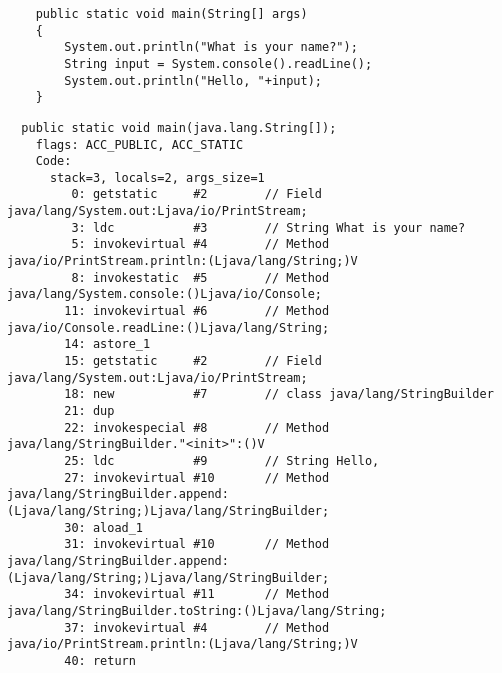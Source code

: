 \subsubsection{}


\begin{lstlisting}
	public static void main(String[] args)
	{
		System.out.println("What is your name?");
		String input = System.console().readLine();
		System.out.println("Hello, "+input);
	}
\end{lstlisting}

\begin{lstlisting}
  public static void main(java.lang.String[]);
    flags: ACC_PUBLIC, ACC_STATIC
    Code:
      stack=3, locals=2, args_size=1
         0: getstatic     #2        // Field java/lang/System.out:Ljava/io/PrintStream;
         3: ldc           #3        // String What is your name?
         5: invokevirtual #4        // Method java/io/PrintStream.println:(Ljava/lang/String;)V
         8: invokestatic  #5        // Method java/lang/System.console:()Ljava/io/Console;
        11: invokevirtual #6        // Method java/io/Console.readLine:()Ljava/lang/String;
        14: astore_1      
        15: getstatic     #2        // Field java/lang/System.out:Ljava/io/PrintStream;
        18: new           #7        // class java/lang/StringBuilder
        21: dup           
        22: invokespecial #8        // Method java/lang/StringBuilder."<init>":()V
        25: ldc           #9        // String Hello, 
        27: invokevirtual #10       // Method java/lang/StringBuilder.append:(Ljava/lang/String;)Ljava/lang/StringBuilder;
        30: aload_1       
        31: invokevirtual #10       // Method java/lang/StringBuilder.append:(Ljava/lang/String;)Ljava/lang/StringBuilder;
        34: invokevirtual #11       // Method java/lang/StringBuilder.toString:()Ljava/lang/String;
        37: invokevirtual #4        // Method java/io/PrintStream.println:(Ljava/lang/String;)V
        40: return        
\end{lstlisting}

